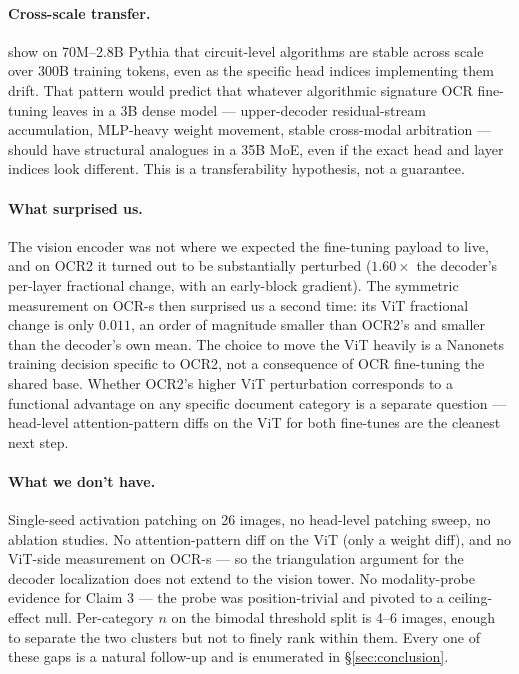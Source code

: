 \documentclass[10pt,twocolumn,letterpaper]{article}
\begin{document}
\paragraph{Cross-scale transfer.} \citet{tigges2024circuitscale} show on 70M--2.8B Pythia that circuit-level algorithms are stable across scale over 300B training tokens, even as the specific head indices implementing them drift. That pattern would predict that whatever algorithmic signature OCR fine-tuning leaves in a 3B dense model --- upper-decoder residual-stream accumulation, MLP-heavy weight movement, stable cross-modal arbitration --- should have structural analogues in a 35B MoE, even if the exact head and layer indices look different. This is a transferability hypothesis, not a guarantee.

\paragraph{What surprised us.} The vision encoder was not where we expected the fine-tuning payload to live, and on OCR2 it turned out to be substantially perturbed ($1.60\times$ the decoder's per-layer fractional change, with an early-block gradient). The symmetric measurement on OCR-s then surprised us a second time: its ViT fractional change is only $0.011$, an order of magnitude smaller than OCR2's and smaller than the decoder's own mean. The choice to move the ViT heavily is a Nanonets training decision specific to OCR2, not a consequence of OCR fine-tuning the shared base. Whether OCR2's higher ViT perturbation corresponds to a functional advantage on any specific document category is a separate question --- head-level attention-pattern diffs on the ViT for both fine-tunes are the cleanest next step.

\paragraph{What we don't have.} Single-seed activation patching on 26 images, no head-level patching sweep, no ablation studies. No attention-pattern diff on the ViT (only a weight diff), and no ViT-side measurement on OCR-s --- so the triangulation argument for the decoder localization does not extend to the vision tower. No modality-probe evidence for Claim 3 --- the probe was position-trivial and pivoted to a ceiling-effect null. Per-category $n$ on the bimodal threshold split is 4--6 images, enough to separate the two clusters but not to finely rank within them. Every one of these gaps is a natural follow-up and is enumerated in \S\ref{sec:conclusion}.
\end{document}
